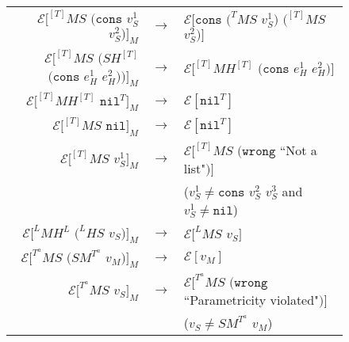 \begin{figure}[p]
\begin{center}
\begin{tabular}{rcl}
$\mathscr{E}[^{[T]}MS$ $(\mathtt{cons}$ $v_{S}^{1}$ $v_{S}^{2})]_{M}$ & $\rightarrow$ & $\mathscr{E}[\mathtt{cons}$ $(^{T}MS$ $v_{S}^{1})$ $(^{[T]}MS$ $v_{S}^{2})]$ \\
$\mathscr{E}[^{[T]}MS$ $(SH^{[T]}$ $(\mathtt{cons}$ $e_{H}^{1}$ $e_{H}^{2}))]_{M}$ & $\rightarrow$ & $\mathscr{E}[^{[T]}MH^{[T]}$ $(\mathtt{cons}$ $e_{H}^{1}$ $e_{H}^{2})]$ \\
$\mathscr{E}[^{[T]}MH^{[T]}$ $\mathtt{nil}^{T}]_{M}$ & $\rightarrow$ & $\mathscr{E}[\mathtt{nil}^{T}]$ \\
$\mathscr{E}[^{[T]}MS$ $\mathtt{nil}]_{M}$ & $\rightarrow$ & $\mathscr{E}[\mathtt{nil}^{T}]$ \\
$\mathscr{E}[^{[T]}MS$ $v_{S}^{1}]_{M}$ & $\rightarrow$ & $\mathscr{E}[^{[T]}MS$ $(\mathtt{wrong}$ ``Not a list"$)]$ \\
&& ($v_{S}^{1}\neq\mathtt{cons}$ $v_{S}^{2}$ $v_{S}^{3}$ and $v_{S}^{1}\neq\mathtt{nil}$) \\
$\mathscr{E}[^{L}MH^{L}$ $(^{L}HS$ $v_{S})]_{M}$ & $\rightarrow$ & $\mathscr{E}[^{L}MS$ $v_{S}]$ \\
$\mathscr{E}[^{T^{a}}MS$ $(SM^{T^{a}}$ $v_{M})]_{M}$ & $\rightarrow$ & $\mathscr{E}[v_{M}]$ \\
$\mathscr{E}[^{T^{a}}MS$ $v_{S}]_{M}$ & $\rightarrow$ & $\mathscr{E}[^{T^{a}}MS$ $(\mathtt{wrong}$ ``Parametricity violated"$)]$ \\
&& ($v_{S}\neq SM^{T^{a}}$ $v_{M}$)
\end{tabular}
\end{center}
\end{figure}